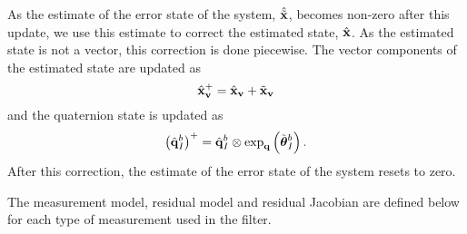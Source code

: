 As the estimate of the error state of the system, $\hat{\tilde{\boldsymbol{\mathrm{x}}}}$, becomes
non-zero after this update, we use this estimate to correct the estimated state,
$\hat{\boldsymbol{\mathrm{x}}}$. As the estimated state is not a vector, this correction is done
piecewise. The vector components of the estimated state are
updated as
\begin{equation}
  \hat{\boldsymbol{\mathrm{\boldsymbol{\mathrm{x}}}}}_{\boldsymbol{\mathrm{v}}}^{+} = \hat{\boldsymbol{\mathrm{\boldsymbol{\mathrm{x}}}}}_{\boldsymbol{\mathrm{v}}} + \tilde{\boldsymbol{\mathrm{\boldsymbol{\mathrm{x}}}}}_{\boldsymbol{\mathrm{v}}}
\end{equation}
and the quaternion state is updated as
\begin{equation}
  \left( \hat{\boldsymbol{\mathrm{q}}}_I^b \right)^{+}  = \hat{\boldsymbol{\mathrm{q}}}_I^b \otimes \exp_{\boldsymbol{\mathrm{q}}} \left(
  \tilde{\boldsymbol{\mathrm{\theta}}}_I^b \right).
\end{equation}
After this correction, the estimate of the error state of the system resets to
zero.

The measurement model, residual model and residual
Jacobian are defined below for each type of measurement used in the filter.


